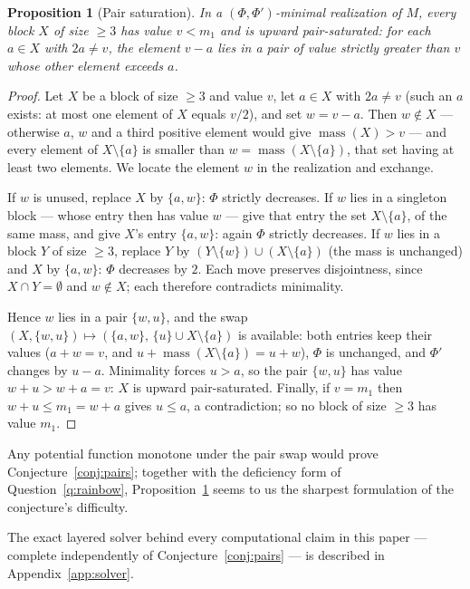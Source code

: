 \documentclass[11pt]{article}
\newtheorem{proposition}[theorem]{Proposition}
\theoremstyle{definition}
\theoremstyle{remark}
\newcommand{\mass}{\operatorname{mass}}
\begin{document}
\begin{proposition}[Pair saturation]\label{prop:saturation}
In a $(\Phi,\Phi')$-minimal realization of $M$, every block $X$ of size
$\ge3$ has value $v<m_1$ and is \emph{upward pair-saturated}: for each
$a\in X$ with $2a\neq v$, the element $v-a$ lies in a pair of value strictly
greater than $v$ whose other element exceeds $a$.
\end{proposition}

\begin{proof}
Let $X$ be a block of size $\ge3$ and value $v$, let $a\in X$ with $2a\neq v$
(such an $a$ exists: at most one element of $X$ equals $v/2$), and set
$w=v-a$. Then $w\notin X$ --- otherwise $a$, $w$ and a third positive element
would give $\mass(X)>v$ --- and every element of $X\setminus\{a\}$ is smaller
than $w=\mass(X\setminus\{a\})$, that set having at least two elements. We
locate the element $w$ in the realization and exchange.

If $w$ is unused, replace $X$ by $\{a,w\}$: $\Phi$ strictly decreases. If $w$
lies in a singleton block --- whose entry then has value $w$ --- give that
entry the set $X\setminus\{a\}$, of the same mass, and give $X$'s entry
$\{a,w\}$: again $\Phi$ strictly decreases. If $w$ lies in a block $Y$ of
size $\ge3$, replace $Y$ by $(Y\setminus\{w\})\cup(X\setminus\{a\})$ (the
mass is unchanged) and $X$ by $\{a,w\}$: $\Phi$ decreases by $2$. Each move
preserves disjointness, since $X\cap Y=\emptyset$ and $w\notin X$; each
therefore contradicts minimality.

Hence $w$ lies in a pair $\{w,u\}$, and the swap
$(X,\{w,u\})\mapsto(\{a,w\},\,\{u\}\cup X\setminus\{a\})$ is available: both
entries keep their values ($a+w=v$, and $u+\mass(X\setminus\{a\})=u+w$),
$\Phi$ is unchanged, and $\Phi'$ changes by $u-a$. Minimality forces $u>a$,
so the pair $\{w,u\}$ has value $w+u>w+a=v$: $X$ is upward pair-saturated.
Finally, if $v=m_1$ then $w+u\le m_1=w+a$ gives $u\le a$, a contradiction; so
no block of size $\ge3$ has value $m_1$.
\end{proof}

Any potential function monotone under the pair swap would prove
Conjecture~\ref{conj:pairs}; together with the deficiency form of
Question~\ref{q:rainbow}, Proposition~\ref{prop:saturation} seems to us the
sharpest formulation of the conjecture's difficulty.

The exact layered solver behind every computational claim in this paper --- complete
independently of Conjecture~\ref{conj:pairs} --- is described in
Appendix~\ref{app:solver}.
\end{document}
